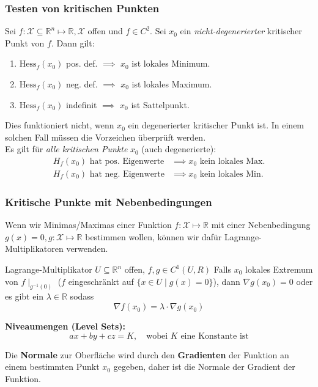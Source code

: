 \documentclass[a4paper,10pt]{article}
\def\R{\mathbb{R}}
\def\X{\mathcal{X}}
\begin{document}
\subsubsection*{Testen von kritischen Punkten}
Sei $f: \X \subseteq \R^n \mapsto \R, \X$ offen und $f\in C^2$. Sei $x_0$ ein \textit{nicht-degenerierter} kritischer Punkt von $f$. Dann gilt:
\begin{enumerate}
    \item $\text{Hess}_f(x_0)$ pos. def. $\implies$ $x_0$ ist lokales Minimum.
    \item $\text{Hess}_f(x_0)$ neg. def. $\implies$ $x_0$ ist lokales Maximum.
    \item $\text{Hess}_f(x_0)$ indefinit $\implies$ $x_0$ ist Sattelpunkt.
\end{enumerate}
Dies funktioniert nicht, wenn $x_0$ ein degenerierter kritischer Punkt ist. In einem solchen Fall müssen die Vorzeichen überprüft werden.\\

\noindent Es gilt für \textit{alle kritischen Punkte} $x_{0}$ (auch degenerierte):
\begin{align*}
H_{f}(x_{0})\text{ hat pos. Eigenwerte}&\implies x_{0}\text{ kein lokales Max.}\\
H_{f}(x_{0})\text{ hat neg. Eigenwerte}&\implies x_{0}\text{ kein lokales Min.}
\end{align*}



\subsubsection*{Kritische Punkte mit Nebenbedingungen}
Wenn wir Minimas/Maximas einer Funktion $f: \X \mapsto \R$ mit einer Nebenbedingung $g(x) = 0, g: \X \mapsto \R$ bestimmen wollen, können wir dafür Lagrange-Multiplikatoren verwenden.

\begin{subbox}{Lagrange-Multiplikator}
    $U\subseteq \mathbb{R}^{n}$ offen, $f,g\in C^{1}(U,R)$  
 Falls $x_{0}$ lokales Extremum von $f\mid_{g^{-1}(0)}$ ($f$ eingeschränkt auf $\{ x \in U \mid g(x)= 0\}$),  
 dann $\nabla g(x_{0})=0$ oder es gibt ein $\lambda \in \mathbb{R}$ sodass  
 $$\nabla f(x_{0})=\lambda \cdot\nabla g(x_{0})$$
\end{subbox}

\noindent\textbf{Niveaumengen (Level Sets):}
$$ax+by+cz=K, \quad \text{wobei }K\text{ eine Konstante ist}$$

\noindent Die \textbf{Normale} zur Oberfläche wird durch den \textbf{Gradienten} der Funktion an einem bestimmten Punkt $x_{0}$ gegeben, daher ist die Normale der Gradient der Funktion.\\
\end{document}
